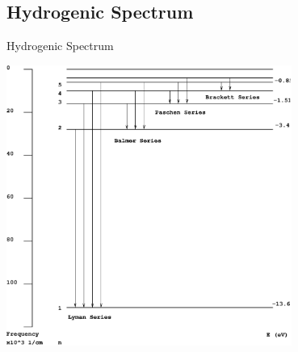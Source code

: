 \documentclass[aspectratio=1610,xcolor=dvipsnames,t]{beamer}
\begin{document}
    \subsection{Hydrogenic Spectrum}
    \begin{frame}{Hydrogenic Spectrum} 

        \centering
        \includegraphics[width=0.7\textwidth]{spectrum}
    \end{frame} 
\end{document}
